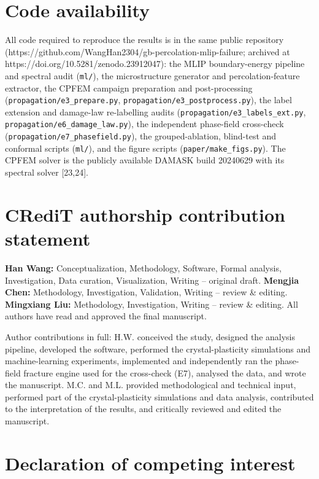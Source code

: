 \documentclass[12pt]{article}
\begin{document}
\section*{Code availability}

{\sloppy
All code required to reproduce the results is in the same public repository (\mbox{https://github.com/WangHan2304/gb-percolation-mlip-failure}; archived at \mbox{https://doi.org/10.5281/zenodo.23912047}): the MLIP boundary-energy pipeline and spectral audit (\texttt{ml/}), the microstructure generator and percolation-feature extractor, the CPFEM campaign preparation and post-processing (\texttt{propagation/e3\_prepare.py}, \texttt{propagation/e3\_postprocess.py}), the label extension and damage-law re-labelling audits (\texttt{propagation/e3\_labels\_ext.py}, \texttt{propagation/e6\_damage\_law.py}), the independent phase-field cross-check (\texttt{propagation/e7\_phasefield.py}), the grouped-ablation, blind-test and conformal scripts (\texttt{ml/}), and the figure scripts (\texttt{paper/make\_figs.py}). The CPFEM solver is the publicly available DAMASK build 20240629 with its spectral solver [23,24].\par}

\section*{CRediT authorship contribution statement}

\textbf{Han Wang:} Conceptualization, Methodology, Software, Formal analysis, Investigation, Data curation, Visualization, Writing -- original draft. \textbf{Mengjia Chen:} Methodology, Investigation, Validation, Writing -- review \& editing. \textbf{Mingxiang Liu:} Methodology, Investigation, Writing -- review \& editing. All authors have read and approved the final manuscript.

Author contributions in full: H.W. conceived the study, designed the analysis pipeline, developed the software, performed the crystal-plasticity simulations and machine-learning experiments, implemented and independently ran the phase-field fracture engine used for the cross-check (E7), analysed the data, and wrote the manuscript. M.C. and M.L. provided methodological and technical input, performed part of the crystal-plasticity simulations and data analysis, contributed to the interpretation of the results, and critically reviewed and edited the manuscript.

\section*{Declaration of competing interest}
\end{document}

